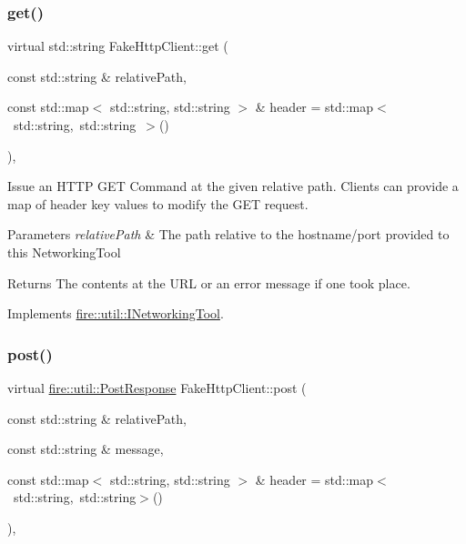 \subsubsection{\texorpdfstring{get()}{get()}}
{\footnotesize\ttfamily virtual std\+::string Fake\+Http\+Client\+::get (\begin{DoxyParamCaption}\item[{const std\+::string \&}]{relative\+Path,  }\item[{const std\+::map$<$ std\+::string, std\+::string $>$ \&}]{header = {\ttfamily std\+:\+:map$<$~std\+:\+:string,~std\+:\+:string~$>$()} }\end{DoxyParamCaption})\hspace{0.3cm}{\ttfamily [inline]}, {\ttfamily [virtual]}}

Issue an H\+T\+TP G\+ET Command at the given relative path. Clients can provide a map of header key values to modify the G\+ET request.


\begin{DoxyParams}{Parameters}
{\em relative\+Path} & The path relative to the hostname/port provided to this Networking\+Tool \\
\hline
\end{DoxyParams}
\begin{DoxyReturn}{Returns}
The contents at the U\+RL or an error message if one took place. 
\end{DoxyReturn}


Implements \hyperlink{a01976_a58e9426e58cbb9c3b975b9d3e6c1f78f}{fire\+::util\+::\+I\+Networking\+Tool}.

\mbox{\label{a01224_ae5364b5e675139717fca7b8add4226da}} 
\subsubsection{\texorpdfstring{post()}{post()}}
{\footnotesize\ttfamily virtual \hyperlink{a01972}{fire\+::util\+::\+Post\+Response} Fake\+Http\+Client\+::post (\begin{DoxyParamCaption}\item[{const std\+::string \&}]{relative\+Path,  }\item[{const std\+::string \&}]{message,  }\item[{const std\+::map$<$ std\+::string, std\+::string $>$ \&}]{header = {\ttfamily std\+:\+:map$<$~std\+:\+:string,~std\+:\+:string$>$()} }\end{DoxyParamCaption})\hspace{0.3cm}{\ttfamily [inline]}, {\ttfamily [virtual]}}

